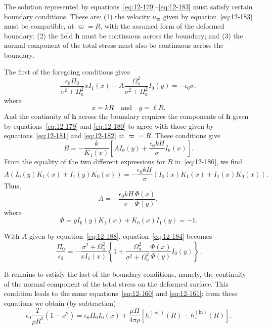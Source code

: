 The solution represented by equations~\eqref{eq:12-179}--\eqref{eq:12-183} must satisfy certain boundary conditions. These are: (1) the velocity $u_\varpi$ given by equation~\eqref{eq:12-183} must be compatible, at $\varpi = R$, with the assumed form of the deformed boundary; (2) the field $\mathbf{h}$ must be continuous across the boundary; and (3) the normal component of the total stress must also be continuous across the boundary.

The first of the foregoing conditions gives
\begin{equation}
\label{eq:12-184}
\frac{\epsilon_0 \Pi_0}{\sigma^2+\Omega_a^2}xI_1(x) - A\frac{\Omega_a^2}{\sigma^2+\Omega_a^2}I_0(y) = -\epsilon_0\sigma,
\end{equation}
where
\begin{equation}
\label{eq:12-185}
x = kR \quad \text{and} \quad y = \ell R.
\end{equation}
And the continuity of $\mathbf{h}$ across the boundary requires the components of $\mathbf{h}$ given by equations~\eqref{eq:12-179} and \eqref{eq:12-180} to agree with those given by equations~\eqref{eq:12-181} and \eqref{eq:12-182} at $\varpi = R$. These conditions give
\begin{equation}
\label{eq:12-186}
B = -\frac{k}{K_1(x)}\left[AI_0(y) + \frac{\epsilon_0 kH}{\sigma}I_0(x)\right].
\end{equation}
From the equality of the two different expressions for $B$ in~\eqref{eq:12-186}, we find
\begin{equation}
\label{eq:12-187}
A(I_0(y)K_1(x) + I_1(y)K_0(x)) = -\frac{\epsilon_0 kH}{\sigma}(I_0(x)K_1(x)+I_1(x)K_0(x)).
\end{equation}
Thus,
\begin{equation}
\label{eq:12-188}
A = -\frac{\epsilon_0 kH}{\sigma}\frac{\Phi(x)}{\Phi(y)},
\end{equation}
where
\begin{equation}
\label{eq:12-189}
\Phi = y I_0(y)K_1(x) + K_0(x)I_1(y) = -1.
\end{equation}

With $A$ given by equation~\eqref{eq:12-188}, equation~\eqref{eq:12-184} becomes
\begin{equation}
\label{eq:12-190}
\frac{\Pi_0}{\epsilon_0} = -\frac{\sigma^2+\Omega_a^2}{xI_1(x)}\left\{1 + \frac{\Omega_a^2}{\sigma^2+\Omega_a^2}\frac{\Phi(x)}{\Phi(y)}I_0(y)\right\}.
\end{equation}

It remains to satisfy the last of the boundary conditions, namely, the continuity of the normal component of the total stress on the deformed surface. This condition leads to the same equations~\eqref{eq:12-160} and \eqref{eq:12-161}; from these equations we obtain (by subtraction)
\begin{equation}
\label{eq:12-191}
\epsilon_0\frac{T}{\rho R^2}(1-x^2) = \epsilon_0\Pi_0 I_0(x) + \frac{\mu H}{4\pi\rho}[h_z^{(\mathrm{ext})}(R) - h_z^{(\mathrm{in})}(R)].
\end{equation}

